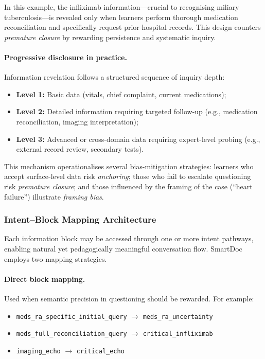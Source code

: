 In this example, the infliximab information—crucial to recognising miliary
tuberculosis—is revealed only when learners perform thorough medication reconciliation
and specifically request prior hospital records.
This design counters \textit{premature closure} by rewarding persistence and systematic
inquiry.

\paragraph{Progressive disclosure in practice.}
Information revelation follows a structured sequence of inquiry depth:

\begin{itemize}
  \item \textbf{Level 1:} Basic data (vitals, chief complaint, current medications);
  \item \textbf{Level 2:} Detailed information requiring targeted follow-up
  (e.g., medication reconciliation, imaging interpretation);
  \item \textbf{Level 3:} Advanced or cross-domain data requiring expert-level probing
  (e.g., external record review, secondary tests).
\end{itemize}

This mechanism operationalises several bias-mitigation strategies:
learners who accept surface-level data risk \textit{anchoring};
those who fail to escalate questioning risk \textit{premature closure};
and those influenced by the framing of the case (``heart failure'')
illustrate \textit{framing bias}.

\subsubsection{Intent–Block Mapping Architecture}

Each information block may be accessed through one or more intent pathways,
enabling natural yet pedagogically meaningful conversation flow.
SmartDoc employs two mapping strategies.

\paragraph{Direct block mapping.}
Used when semantic precision in questioning should be rewarded.
For example:

\begin{itemize}
  \item \texttt{meds\_ra\_specific\_initial\_query} $\rightarrow$ \texttt{meds\_ra\_uncertainty}
  \item \texttt{meds\_full\_reconciliation\_query} $\rightarrow$ \texttt{critical\_infliximab}
  \item \texttt{imaging\_echo} $\rightarrow$ \texttt{critical\_echo}
\end{itemize}

